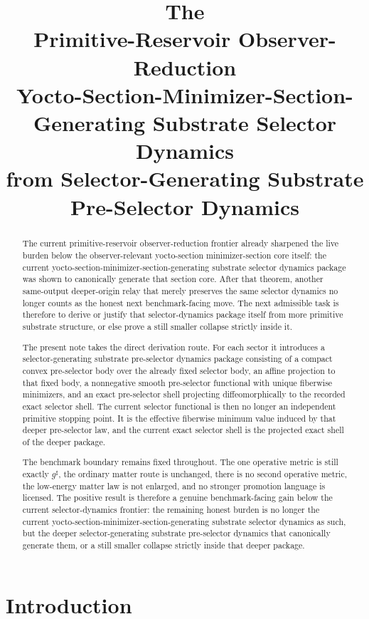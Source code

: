 \documentclass[11pt]{article}
\title{\textbf{The \TheoryName{}}\\[0.4em]
\large Primitive-Reservoir Observer-Reduction\\
\large Yocto-Section-Minimizer-Section-Generating Substrate Selector Dynamics\\
\large from Selector-Generating Substrate Pre-Selector Dynamics}
\author{}
\date{}
\newcommand{\CompletedMetric}{g^{\sharp}}
\begin{document}
\maketitle

\begin{abstract}
The current primitive-reservoir observer-reduction frontier already sharpened the live burden below the observer-relevant yocto-section minimizer-section core itself: the current yocto-section-minimizer-section-generating substrate selector dynamics package was shown to canonically generate that section core. After that theorem, another same-output deeper-origin relay that merely preserves the same selector dynamics no longer counts as the honest next benchmark-facing move. The next admissible task is therefore to derive or justify that selector-dynamics package itself from more primitive substrate structure, or else prove a still smaller collapse strictly inside it.

The present note takes the direct derivation route. For each sector it introduces a selector-generating substrate pre-selector dynamics package consisting of a compact convex pre-selector body over the already fixed selector body, an affine projection to that fixed body, a nonnegative smooth pre-selector functional with unique fiberwise minimizers, and an exact pre-selector shell projecting diffeomorphically to the recorded exact selector shell. The current selector functional is then no longer an independent primitive stopping point. It is the effective fiberwise minimum value induced by that deeper pre-selector law, and the current exact selector shell is the projected exact shell of the deeper package.

The benchmark boundary remains fixed throughout. The one operative metric is still exactly \(\CompletedMetric\), the ordinary matter route is unchanged, there is no second operative metric, the low-energy matter law is not enlarged, and no stronger promotion language is licensed. The positive result is therefore a genuine benchmark-facing gain below the current selector-dynamics frontier: the remaining honest burden is no longer the current yocto-section-minimizer-section-generating substrate selector dynamics as such, but the deeper selector-generating substrate pre-selector dynamics that canonically generate them, or a still smaller collapse strictly inside that deeper package.
\end{abstract}

\section{Introduction}
\end{document}
